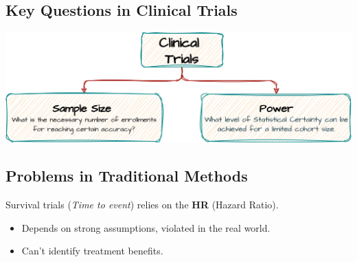 \documentclass[a0,landscape]{a0poster}
\newcommand{\xmark}{\ding{55}}              %
\begin{document}
\begin{minipage}[t]{0.44\linewidth}

    \subsection*{\color{HeadingColor}\Large Key Questions in Clinical Trials}
    {\centering \includegraphics[width=\linewidth,height = 0.45\linewidth]{images/diag-CT.png}\par}

    \subsection*{\color{HeadingColor}\Large Problems in Traditional Methods}
    \Large Survival trials (\textit{Time to event}) relies on the \textbf{HR} (Hazard Ratio).
   \begin{itemize}[label={\color{BulletColor}\Large \xmark}]
    \item \Large Depends on strong assumptions, violated in the real world.
    \item \Large Can't identify treatment benefits.
\end{itemize}


\end{minipage}
\end{document}
